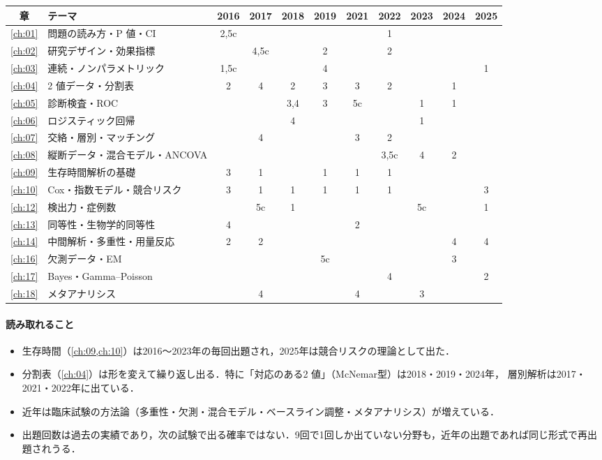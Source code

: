 \begin{center}\small
\setlength{\tabcolsep}{3.2pt}
\begin{tabular}{@{}clccccccccc@{}}
\toprule
章 & テーマ & 2016 & 2017 & 2018 & 2019 & 2021 & 2022 & 2023 & 2024 & 2025\\
\midrule
\ref{ch:01} & 問題の読み方・P 値・CI & 2,5c & & & & & 1 & & & \\
\ref{ch:02} & 研究デザイン・効果指標 & & 4,5c & & 2 & & 2 & & & \\
\ref{ch:03} & 連続・ノンパラメトリック & 1,5c & & & 4 & & & & & 1\\
\ref{ch:04} & 2 値データ・分割表 & 2 & 4 & 2 & 3 & 3 & 2 & & 1 & \\
\ref{ch:05} & 診断検査・ROC & & & 3,4 & 3 & 5c & & 1 & 1 & \\
\ref{ch:06} & ロジスティック回帰 & & & 4 & & & & 1 & & \\
\ref{ch:07} & 交絡・層別・マッチング & & 4 & & & 3 & 2 & & & \\
\ref{ch:08} & 縦断データ・混合モデル・ANCOVA & & & & & & 3,5c & 4 & 2 & \\
\ref{ch:09} & 生存時間解析の基礎 & 3 & 1 & & 1 & 1 & 1 & & & \\
\ref{ch:10} & Cox・指数モデル・競合リスク & 3 & 1 & 1 & 1 & 1 & 1 & & & 3\\
\ref{ch:12} & 検出力・症例数 & & 5c & 1 & & & & 5c & & 1\\
\ref{ch:13} & 同等性・生物学的同等性 & 4 & & & & 2 & & & & \\
\ref{ch:14} & 中間解析・多重性・用量反応 & 2 & 2 & & & & & & 4 & 4\\
\ref{ch:16} & 欠測データ・EM & & & & 5c & & & & 3 & \\
\ref{ch:17} & Bayes・Gamma--Poisson & & & & & & 4 & & & 2\\
\ref{ch:18} & メタアナリシス & & 4 & & & 4 & & 3 & & \\
\bottomrule
\end{tabular}
\end{center}

\paragraph{読み取れること}
\begin{itemize}
\item 生存時間（\cref{ch:09,ch:10}）は2016〜2023年の毎回出題され，2025年は競合リスクの理論として出た．
\item 分割表（\cref{ch:04}）は形を変えて繰り返し出る．特に「対応のある2 値」（McNemar型）は2018・2019・2024年，
      層別解析は2017・2021・2022年に出ている．
\item 近年は臨床試験の方法論（多重性・欠測・混合モデル・ベースライン調整・メタアナリシス）が増えている．
\item 出題回数は過去の実績であり，次の試験で出る確率ではない．9回で1回しか出ていない分野も，近年の出題であれば同じ形式で再出題されうる．
\end{itemize}

